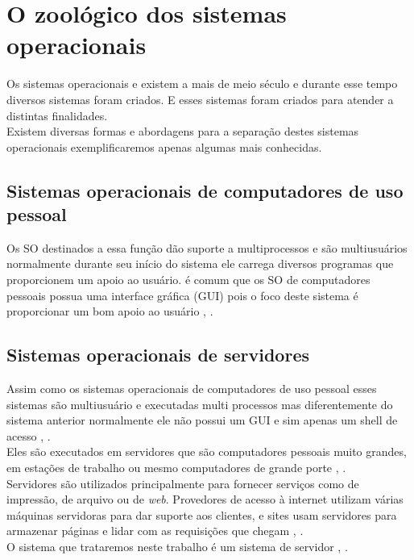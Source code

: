 \section{O zoológico dos sistemas operacionais}
Os sistemas operacionais e existem a mais de meio século e durante esse tempo diversos sistemas foram criados. E esses sistemas foram criados para atender a distintas finalidades.\\
Existem diversas formas e abordagens para a separação destes sistemas operacionais exemplificaremos apenas algumas mais conhecidas.

\subsection{Sistemas operacionais de computadores de uso pessoal}

Os SO destinados a essa função dão suporte a multiprocessos e são multiusuários normalmente durante seu início do sistema ele carrega diversos programas que proporcionem um apoio ao usuário. é comum que os SO de computadores pessoais possua uma interface gráfica (GUI) pois o foco deste sistema é proporcionar um bom apoio ao usuário \cite{Tanenbaum2016}, \cite{Comer2012}.\\

\subsection{Sistemas operacionais de servidores}

Assim como os sistemas operacionais de computadores de uso pessoal esses sistemas são multiusuário e executadas multi processos mas diferentemente do sistema anterior normalmente ele não possui um GUI e sim apenas um shell de acesso \cite{Tanenbaum2016}, \cite{Comer2012}.\\
Eles são executados em servidores que são computadores pessoais muito grandes, em estações de trabalho ou mesmo computadores de grande porte \cite{Tanenbaum2016}, \cite{Comer2012}.\\
Servidores são utilizados principalmente para fornecer serviços como  de impressão, de arquivo ou de \emph{web}. Provedores de acesso à internet utilizam várias máquinas servidoras para dar suporte aos clientes, e sites usam servidores para armazenar páginas e lidar com as requisições que chegam \cite{Tanenbaum2016}, \cite{Comer2012}.\\
O sistema que trataremos neste trabalho é um sistema de servidor \cite{Tanenbaum2016}, \cite{Comer2012}.\\

